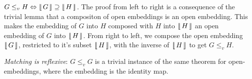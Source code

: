 \documentclass[runningheads]{llncs}
\newcommand{\tensor}{\otimes}
\newcommand{\vinterp}[1]{\lfloor\hspace{-0.27em}|\, #1\, |\hspace{-0.27em}\rfloor}
\begin{document}
\begin{theorem}
\label{match-interp-thm}
$G \leq_v H \Leftrightarrow \vinterp{G} \supseteq \vinterp{H}$. The
proof from left to right is a consequence of the trivial lemma that a
compositon of open embeddings is an open embedding. This makes the
embedding of $G$ into $H$ composed with $H$ into $\vinterp{H}$ an open
embedding of $G$ into $\vinterp{H}$. From right to left, we compose
the open embedding $\vinterp{G}$, restricted to it's subset
$\vinterp{H}$, with the inverse of $\vinterp{H}$ to get $G \leq_v H$.
\end{theorem}

\begin{theorem}
\label{reflexive-match-thm}
\emph{Matching is reflexive}: $G \leq_v G$ is a trivial instance of
the same theorem for open-embeddings, where the embedding is the
identity map.
\end{theorem}





\end{document}

